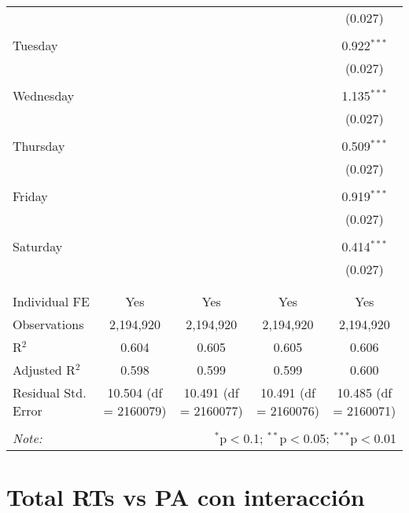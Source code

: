 \documentclass[
]{article}
\begin{document}
\begin{table}[!htbp]
{\begin{tabular}{@{\extracolsep{5pt}}lcccc}
  &  &  &  & (0.027) \\ 
  & & & & \\ 
 Tuesday &  &  &  & 0.922$^{***}$ \\ 
  &  &  &  & (0.027) \\ 
  & & & & \\ 
 Wednesday &  &  &  & 1.135$^{***}$ \\ 
  &  &  &  & (0.027) \\ 
  & & & & \\ 
 Thursday &  &  &  & 0.509$^{***}$ \\ 
  &  &  &  & (0.027) \\ 
  & & & & \\ 
 Friday &  &  &  & 0.919$^{***}$ \\ 
  &  &  &  & (0.027) \\ 
  & & & & \\ 
 Saturday &  &  &  & 0.414$^{***}$ \\ 
  &  &  &  & (0.027) \\ 
  & & & & \\ 
\hline \\[-1.8ex] 
Individual FE & Yes & Yes & Yes & Yes \\ 
Observations & 2,194,920 & 2,194,920 & 2,194,920 & 2,194,920 \\ 
R$^{2}$ & 0.604 & 0.605 & 0.605 & 0.606 \\ 
Adjusted R$^{2}$ & 0.598 & 0.599 & 0.599 & 0.600 \\ 
Residual Std. Error & 10.504 (df = 2160079) & 10.491 (df = 2160077) & 10.491 (df = 2160076) & 10.485 (df = 2160071) \\ 
\hline 
\hline \\[-1.8ex] 
\textit{Note:}  & \multicolumn{4}{r}{$^{*}$p$<$0.1; $^{**}$p$<$0.05; $^{***}$p$<$0.01} \\ 
\end{tabular}
} 
\end{table} 
\newpage
\section{Total RTs vs PA con interacción}
\end{document}
